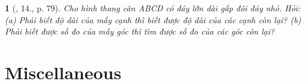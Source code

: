 \documentclass{article}
\newtheorem{baitoan}{}
\begin{document}
\begin{baitoan}[\cite{Tuyen_Toan_6}, 14., p. 79]
	Cho hình thang cân ABCD có đáy lớn dài gấp đôi đáy nhỏ. Hỏi: (a) Phải biết độ dài của mấy cạnh thì biết được độ dài của các cạnh còn lại? (b) Phải biết được số đo của mấy góc thì tìm được số đo của các góc còn lại?
\end{baitoan}


\section{Miscellaneous}


\printbibliography[heading=bibintoc]
\end{document}
